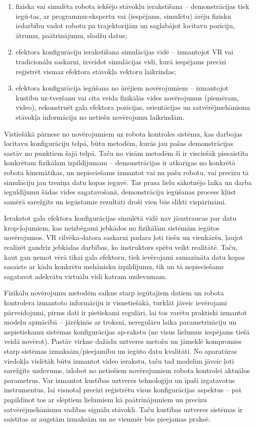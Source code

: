\documentclass[12pt, a4paper]{article}
\numberwithin{equation}{section} %
\begin{document}
\begin{enumerate}
    \item fiziska vai simulēta robota iekšējo stāvokļu ierakstīšana -- demonstrācijas tiek iegū-tas, ar programmu-ekspertu vai (iespējams, simulētu) ārēju fizisku iedarbību vadot robotu pa trajektorijām un saglabājot locītavu pozīciju, ātrumu, paātrinājumu, slodžu datus;
    \item efektora konfigurāciju ierakstīšana simulācijas vidē -- izmantojot VR vai tradicionālu saskarni, izveidot simulācijas vidi, kurā iespējams precīzi reģistrēt vismaz efektora stāvokļa vektoru laikrindas;
    \item efektora konfigurācija iegūšana no ārējiem novērojumiem -- izmantojot kustību uz-tveršanu vai cita veida fizikālās vides novērojumus (piemēram, video), rekonstruēt gala efektora pozīcijas, orientācijas un satvērējmehānisma stāvokļa informāciju no netiešu novērojumu laikrindām.
\end{enumerate}

Vistiešākā pārnese no novērojumiem uz robota kontroles sistēmu, kas darbojas locītavu konfigurāciju telpā, būtu metodēm, kurās jau pašas demonstrācijas sastāv no punktiem šajā telpā. Taču no visām metodēm šī ir visciešāk piesaistīta konkrētam fizikālam izpildījumam -- demonstrācijas ir atkarīgas no konkrētā robota kinemātikas, un nepieciešams izmantot vai nu pašu robotu, vai precīzu tā simulāciju jau treniņa datu kopas ieguvē. Tas prasa lielu sākotnējo laika un darba ieguldījumu šādas vides sagatavošanā, demonstrāciju iegūšanas process kļūst samērā sarežģīts un iegūstamie rezultāti droši vien būs slikti vispārināmi.

Ierakstot gala efektora konfigurācijas simulētā vidē nav jāuztraucas par datu krop-ļojumiem, kas neizbēgami jebkādos no fizikālām sistēmām iegūtos novērojumos. VR cilvēka-datora saskarni padara ļoti tiešu un vienkāršu, ļaujot realizēt gandrīz jebkādas darbības, ko instruktors spētu veikt realitātē. Taču, kaut gan ņemot vērā tikai gala efektoru, tiek ievērojami samazināta datu kopas sasaiste ar kādu konkrētu mehānisku izpildījumu, tik un tā nepieciešams sagatavot adekvātu virtuālu vidi katram uzdevumam.

Fizikālu novērojumu metodēm saikne starp iegūtajiem datiem un robota kontrolera izmantoto informāciju ir visnetiešākā, turklāt jāveic ievērojami pārveidojumi, pirms dati ir pietiekami regulāri, lai tos varētu praktiski izmantot modeļu apmācībā -- jārēķinās ar troksni, neregulāru laika parametrizāciju un nepietiekamu sistēmas konfigurācijas ap-rakstu (ne visus lielumus iespējams tiešā veidā novērot). Pastāv virkne dažādu uztveres metožu un jāmeklē kompromiss starp sistēmas izmaksām/pieejamību un iegūto datu kvalitāti. No aparatūras viedokļa vislētāk būtu izmantot video ierakstu, taču tad modelim jāveic ļoti sarežģīts uzdevums, izlobot no netiešiem novērojumiem robota kontrolei aktuālos parametrus. Var izmantot kustības uztveres tehnoloģiju un īpaši izgatavotus instrumentus, lai visnotaļ precīzi reģistrētu visus konfigurācijas aspektus -- pat papildinot tos ar slēptiem lielumiem kā paātrinājumiem un precīzu satvērējmehānismu vadības signālu stāvokli. Taču kustības uztveres sistēmas ir saistītas ar augstām izmaksām un ne vienmēr būs pieejamas praksē.
\end{document}
